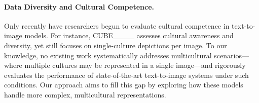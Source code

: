 \paragraph{Data Diversity and Cultural Competence.} Only recently have researchers begun to evaluate cultural competence in text-to-image models. For instance, CUBE____ assesses cultural awareness and diversity, yet still focuses on single-culture depictions per image. To our knowledge, no existing work systematically addresses multicultural scenarios—where multiple cultures may be represented in a single image—and rigorously evaluates the performance of state-of-the-art text-to-image systems under such conditions. Our approach aims to fill this gap by exploring how these models handle more complex, multicultural representations.